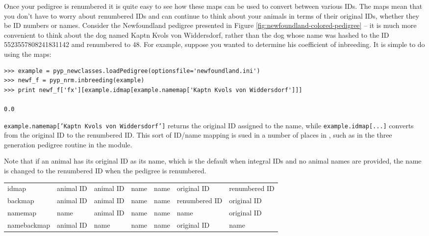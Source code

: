 Once your pedigree is renumbered it is quite easy to see how these maps can be used to convert between various IDs. The maps mean that you don't have to worry about renumbered IDs and can continue to think about your animals in terms of their original IDs, whether they be ID numbers or names. Consider the Newfoundland pedigree presented in Figure \ref{fig:newfoundland-colored-pedigree} -- it is much more convenient to think about the dog named Kaptn Kvols von Widdersdorf, rather than the dog whose name was hashed to the ID 5523557808241831142 amd renumbered to 48. For example, suppose you wanted to determine his coefficient of inbreeding. It is simple to do using the maps:
\begin{verbatim}
>>> example = pyp_newclasses.loadPedigree(optionsfile='newfoundland.ini')
>>> newf_f = pyp_nrm.inbreeding(example)
>>> print newf_f['fx'][example.idmap[example.namemap['Kaptn Kvols von Widdersdorf']]]

0.0
\end{verbatim}
\texttt{example.namemap['Kaptn Kvols von Widdersdorf']} returns the original ID assigned to the name, while \texttt{example.idmap[...]} converts from the original ID to the renumbered ID. This sort of ID/name mapping is sued in a number of places in \PyPedal{}, such as in the three generation pedigree routine in the  module.

Note that if an animal has its original ID as its name, which is the default when integral IDs and no animal names are provided, the name is changed to the renumbered ID when the pedigree is renumbered.
\begin{center}
    \tablelasttail{\hline}
    \label{tbl:methodology-id-mapping}
    \begin{xtabular}{l|l|l|l|l|l|l}
	idmap & animal ID & animal ID & name & name & original ID & renumbered ID \\
	backmap & animal ID & animal ID & name & name & renumbered ID & original ID \\
	namemap & name & animal ID & name & name & name & original ID \\
	namebackmap & animal ID & name & name & name & original ID & name \\
    \end{xtabular}
\end{center}
